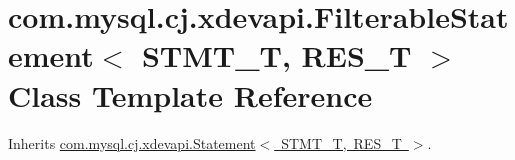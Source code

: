 \hypertarget{classcom_1_1mysql_1_1cj_1_1xdevapi_1_1_filterable_statement}{}\section{com.\+mysql.\+cj.\+xdevapi.\+Filterable\+Statement$<$ S\+T\+M\+T\+\_\+T, R\+E\+S\+\_\+T $>$ Class Template Reference}
\label{classcom_1_1mysql_1_1cj_1_1xdevapi_1_1_filterable_statement}


Inherits \mbox{\hyperlink{interfacecom_1_1mysql_1_1cj_1_1xdevapi_1_1_statement}{com.\+mysql.\+cj.\+xdevapi.\+Statement$<$ S\+T\+M\+T\+\_\+\+T, R\+E\+S\+\_\+\+T $>$}}.

